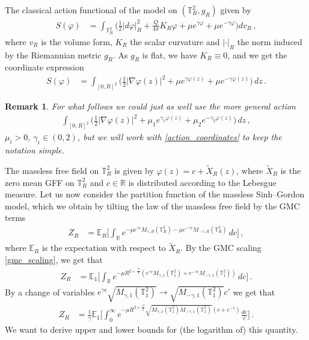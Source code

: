 \documentclass[11pt]{article}
\numberwithin{equation}{section}
\newtheorem{remark}[theorem]{Remark}
\theoremstyle{definition}
\renewcommand{\tilde}{\widetilde}          %
\newcommand{\R}{\mathbb{R}}
\newcommand{\E}{\mathbb{E}}
\def\T{\mathbb{T}}
\newcommand{\ab}{|}
\newcommand{\tor}{{\T_1^2}}
\newcommand{\toR}{{\T_R^2}}
\begin{document}
\noindent The classical action functional of the model on $(\toR, g_R)$ given by
\begin{align*}
S(\varphi) &= \int_{\toR} \big( \tfrac 12 \ab d \varphi \ab_R^2 + \tfrac{Q}{4\pi} K_R \varphi + \mu e^{\gamma \varphi} + \mu e^{-\gamma \varphi} \big) dv_{R}\,,
\end{align*}
where $v_R$ is the volume form, $K_R$ the scalar curvature and $\ab \cdot \ab_R$ the norm induced by the Riemannian metric $g_R$. As $g_R$ is flat, we have $K_R \equiv 0$, and we get the coordinate expression
\begin{align}\label{action_coordinates}
S(\varphi) &= \int_{[0,R]^2} \big( \tfrac 12 \ab \nabla \varphi(z) \ab^2 + \mu e^{\gamma \varphi(z)} + \mu e^{-\gamma \varphi(z)} \big) \, dz \,.
\end{align}
\begin{remark}
For what follows we could just as well use the more general action
\begin{align*}
\int_{[0,R]^2} \big( \tfrac 12 \ab \nabla \varphi(z) \ab^2 + \mu_1 e^{\gamma_1 \varphi(z)} + \mu_2 e^{-\gamma_2 \varphi(z)} \big) \, dz\,,
\end{align*}
$\mu_i > 0$, $\gamma_i \in (0,2)$, but we will work with \eqref{action_coordinates} to keep the notation simple.
\end{remark}
\noindent The massless free field on $\toR$ is given by $\varphi(z) = c+\tilde X_R(z)$, where $\tilde X_R$ is the zero mean GFF on $\toR$ and $c \in \R$ is distributed according to the Lebesgue measure. Let us now consider the partition function of the massless Sinh--Gordon model, which we obtain by tilting the law of the massless free field by the GMC terms
\begin{align*}
Z_R &= \E_R \Big[ \int_\R  e^{ - \mu e^{\gamma c} M_{\gamma,R}(\toR) - \mu e^{-\gamma c} M_{-\gamma,R}(\toR)  } \, dc \Big] \,,
\end{align*}
where $\E_R$ is the expectation with respect to $\tilde X_R$. By the GMC scaling \eqref{gmc_scaling}, we get that 
\begin{align*}
Z_R &= \E_1 \Big[ \int_\R e^{- \mu R^{2 + \frac{\gamma^2}{2}} (e^{\gamma c} M_{\gamma,1}(\tor) + e^{-\gamma c} M_{-\gamma,1}(\tor)) } \, dc \Big]\,.
\end{align*}
By a change of variables $e^{\gamma c} \sqrt{M_{\gamma,1}(\tor)} \to  \sqrt{ M_{-\gamma,1}(\tor)}c' $ we get that
\begin{align*}
Z_R &= \tfrac 1 \gamma \E_1 \Big[ \int_0^\infty e^{- \mu R^{2+\frac{\gamma^2}{2}} \sqrt{M_{\gamma,1}(\tor) M_{-\gamma,1}(\tor)} (c+c^{-1}) } \tfrac{dc}{c} \Big]\,.
\end{align*}
We want to derive upper and lower bounds for (the logarithm of) this quantity.
\end{document}
